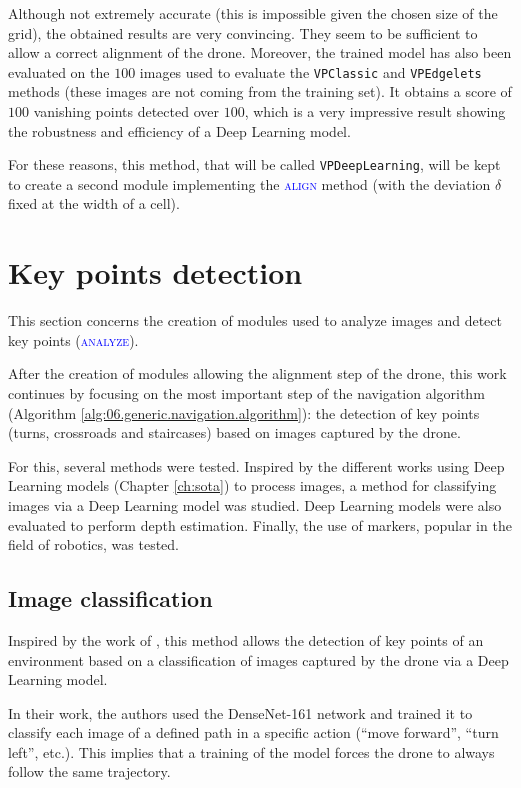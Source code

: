 Although not extremely accurate (this is impossible given the chosen size of the grid), the obtained results are very convincing. They seem to be sufficient to allow a correct alignment of the drone. Moreover, the trained model has also been evaluated on the $\num{100}$ images used to evaluate the \texttt{VPClassic} and \texttt{VPEdgelets} methods (these images are not coming from the training set). It obtains a score of $\num{100}$ vanishing points detected over $\num{100}$, which is a very impressive result showing the robustness and efficiency of a Deep Learning model.

For these reasons, this method, that will be called \texttt{VPDeepLearning}, will be kept to create a second module implementing the \textsc{\textcolor{blue}{align}} method (with the deviation $\delta$ fixed at the width of a cell).

\section{Key points detection}

This section concerns the creation of modules used to analyze images and detect key points (\textsc{\textcolor{blue}{analyze}}).

After the creation of modules allowing the alignment step of the drone, this work continues by focusing on the most important step of the navigation algorithm (Algorithm \ref{alg:06.generic.navigation.algorithm}): the detection of key points (turns, crossroads and staircases) based on images captured by the drone.

For this, several methods were tested. Inspired by the different works using Deep Learning models (Chapter \ref{ch:sota}) to process images, a method for classifying images via a Deep Learning model was studied. Deep Learning models were also evaluated to perform depth estimation. Finally, the use of markers, popular in the field of robotics, was tested.

\subsection{Image classification}\label{sec:06.image.classification}

Inspired by the work of \textcite{padhy2018deep}, this method allows the detection of key points of an environment based on a classification of images captured by the drone via a Deep Learning model.

In their work, the authors used the DenseNet-161 network and trained it to classify each image of a defined path in a specific action (\enquote{move forward}, \enquote{turn left}, etc.). This implies that a training of the model forces the drone to always follow the same trajectory.

